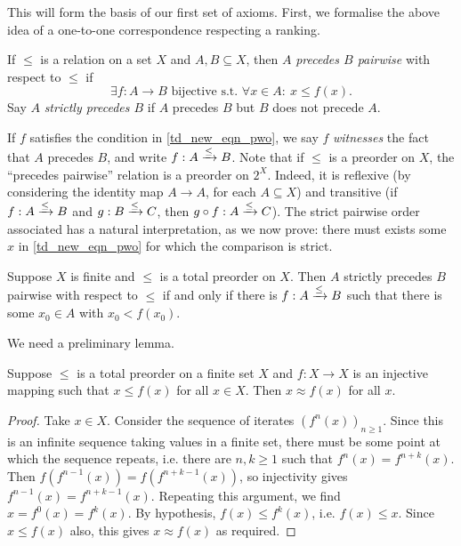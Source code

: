 This will form the basis of our first set of axioms. First, we formalise the
above idea of a one-to-one correspondence respecting a ranking.

\begin{definition}
    If $\le$ is a relation on a set $X$ and $A, B \subseteq X$, then $A$
    \emph{precedes $B$ pairwise} with respect to $\le$ if
    \begin{equation}
        \label{td_new_eqn_pwo}
        \exists f: A \to B \text{ bijective s.t. }
        \forall x \in A:\ x \le f(x).
    \end{equation}
    Say $A$ \emph{strictly precedes $B$} if $A$ precedes $B$ but $B$ does not
    precede $A$.
\end{definition}

If $f$ satisfies the condition in \cref{td_new_eqn_pwo}, we say $f$
\emph{witnesses} the fact that $A$ precedes $B$, and write
${f}:{A} \xrightarrow{\le} {B}$.  Note that if $\le$ is a preorder on $X$, the
``precedes pairwise'' relation is a preorder on $2^X$.  Indeed, it is reflexive
(by considering the identity map $A \to A$, for each $A \subseteq X$) and
transitive (if ${f}:{A} \xrightarrow{\le} {B}$ and ${g}:{B} \xrightarrow{\le} {C}$, then
${g \circ f}:{A} \xrightarrow{\le} {C}$). The strict pairwise order associated has a
natural interpretation, as we now prove: there must exists some $x$ in
\cref{td_new_eqn_pwo} for which the comparison is strict.

\begin{proposition}
    \label{td_new_prop_pwo_strict_part}
    Suppose $X$ is finite and $\le$ is a total preorder on $X$. Then $A$
    strictly precedes $B$ pairwise with respect to $\le$ if and only if there
    is ${f}:{A} \xrightarrow{\le} {B}$ such that there is some $x_0 \in A$ with $x_0 <
    f(x_0)$.
\end{proposition}

We need a  preliminary lemma.

\begin{lemma}
    \label{td_new_lemma_pwo_strict_helper}
    Suppose $\le$ is a total preorder on a finite set $X$ and $f: X \to X$ is
    an injective mapping such that $x \le f(x)$ for all $x \in X$. Then $x
    \approx f(x)$ for all $x$.
\end{lemma}

\begin{proof}
    Take $x \in X$. Consider the sequence of iterates $(f^n(x))_{n \ge 1}$.
    Since this is an infinite sequence taking values in a finite set, there
    must be some point at which the sequence repeats, i.e. there are $n, k \ge
    1$ such that $f^n(x) = f^{n + k}(x)$. Then $f(f^{n - 1}(x)) = f(f^{n + k -
    1}(x))$, so injectivity gives $f^{n - 1}(x) = f^{n + k - 1}(x)$. Repeating
    this argument, we find $x = f^0(x) = f^k(x)$. By hypothesis, $f(x) \le
    f^k(x)$, i.e. $f(x) \le x$. Since $x \le f(x)$ also, this gives $x \approx
    f(x)$ as required.
\end{proof}


